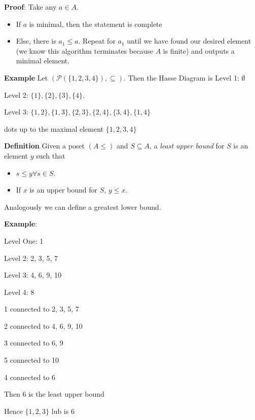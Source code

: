 \documentclass{article}
\begin{document}
    \vspace{1.5mm}
    \textbf{Proof}: Take any $a \in A$.
    \begin{itemize}
        \item If $a$ is minimal, then the statement is complete
        \item Else, there is $a_{1} \le a$. Repeat for $a_{1}$ until we have found our desired element (we know this algorithm terminates because $A$ is finite) and outputs a minimal element.
    \end{itemize}
    
    \vspace{1.5mm}
    \textbf{Example}
    Let $(\mathcal{P}(\{1, 2, 3, 4\}), \subseteq)$. Then the Hasse Diagram is 
    Level 1: $\emptyset$
    
    Level 2: $\{1\}, \{2\}, \{3\}, \{4\}$.
    
    Level 3: $\{1, 2\}, \{1, 3\}, \{2, 3\}, \{2, 4\}, \{3, 4\}, \{1, 4\}$
    
    dots 
    up to the maximal element $\{1, 2, 3, 4\}$
    
    \vspace{1.5mm}
    \textbf{Definition} Given a poset $(A \le)$ and $S \subseteq A$, a \textit{least upper bound} for $S$ is an element $y$ such that 
    \begin{itemize}
        \item $s \le y \forall s \in S$.
        \item If $x$ is an upper bound for $S$, $y \le x$.
    \end{itemize}
    Analogously we can define a greatest lower bound.
    
    \vspace{1.5mm}
    \textbf{Example}: 
    
    Level One: 1
    
    Level 2: 2, 3, 5, 7
    
    Level 3: 4, 6, 9, 10
    
    Level 4: 8
    
    1 connected to 2, 3, 5, 7
    
    2 connected to 4, 6, 9, 10
    
    3 connected to 6, 9
    
    5 connected to 10
    
    4 connected to 6
    
    Then $6$ is the least upper bound
    
    \vspace{1.5mm}
    Hence $\{1, 2, 3\}$ lub is 6
    
\end{document}
